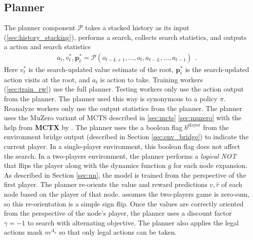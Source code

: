 \subsection{Planner} \label{sec:planner}
The planner component $\mathcal{P}$ takes a stacked history as its input (\ref{sec:history_stacking}), performs a search, collects search statistics, and outputs a action and search statistics
\begin{align*}
    a_t, v^*_t, \mathbf{p}^*_t = \mathcal{P}(o_{t - L + 1}, \dots, o_t, a_{t - L}, \dots, a_{t - 1}) ~~ .
\end{align*}
Here $v^*_t$ is the search-updated value estimate of the root, $\mathbf{p}^*_t$ is the search-updated action visits at the root, and $a_t$ is action to take.
Training workers (\ref{sec:train_rw}) use the full planner.
Testing workers only use the action output from the planner.
The planner used this way is synonymous to a policy $\pi$.
Reanalyze workers only use the output statistics from the planner.
The planner uses the MuZero variant of MCTS described in \ref{sec:mcts} \ref{sec:muzero} with the help from \textbf{MCTX} by \citeauthor{POLICYIMPROVEMENTPLANNING_Danihelka.Guez.ea_2022} \cite{POLICYIMPROVEMENTPLANNING_Danihelka.Guez.ea_2022}.
The planner uses the a boolean flag $b^{\text{player}}$ from the environment bridge output (described in Section \ref{sec:env_bridge}) to indicate the current player.
In a single-player environment, this boolean flag does not affect the search.
In a two-players environment, the planner performs a \textit{logical NOT} that flips the player along with the dynamics function \(g\) for each node expansion.
As described in Section \ref{sec:nn}, the model is trained from the perspective of the first player.
The planner re-orients the value and reward predictions $v, \hat{r}$ of each node based on the player of that node.
\moozi assumes the two-players game is zero-sum, so this re-orientation is a simple sign flip.
Once the values are correctly oriented from the perspective of the node's player, the planner uses a discount factor $\gamma = -1$ to search with alternating objective. 
The planner also applies the legal actions mask $m^{A_a}$ so that only legal actions can be taken.


